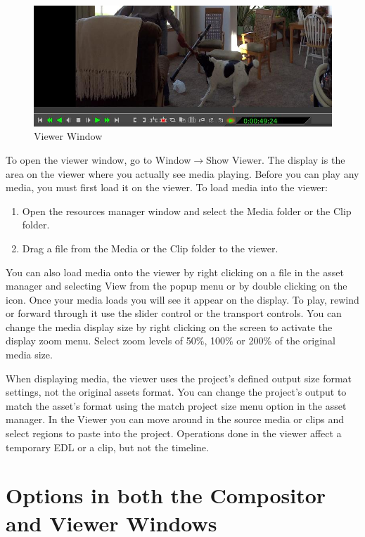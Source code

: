 \begin{figure}[htpb]
    \centering
    \includegraphics[width=0.99\linewidth]{images/viewer_window.png}
    \caption{Viewer Window}
    \label{fig:viewer_window}
\end{figure}

To open the viewer window, go to Window$\rightarrow$Show Viewer.  
The display is the area on the viewer where you actually see media playing.  
Before you can play any media, you must first load it on the viewer. 
To load media into the viewer:

\begin{enumerate}
    \item  Open the resources manager window and select the Media folder or the Clip folder.
    \item  Drag a file from the Media or the Clip folder to the viewer.
\end{enumerate}

You can also load media onto the viewer by right clicking on a file in the asset manager and selecting View from the popup menu or by double clicking on the icon. 
Once your media loads you will see it appear on the display. 
To play, rewind or forward through it use the slider control or the transport controls. 
You can change the media display size by right clicking on the screen to activate the display zoom menu. 
Select zoom levels of 50\%, 100\% or 200\% of the original media size.

When displaying media, the viewer uses the project's defined output size format settings, not the original assets format. 
You can change the project's output to match the asset's format using the match project size menu option in the asset manager. 
In the Viewer you can move around in the source media or clips and select regions to paste into the project. 
Operations done in the viewer affect a temporary EDL or a clip, but not the timeline.

\section{Options in both the Compositor and Viewer Windows}%
\label{sec:options_in_both_the_compositor_and_viewer_windows}

